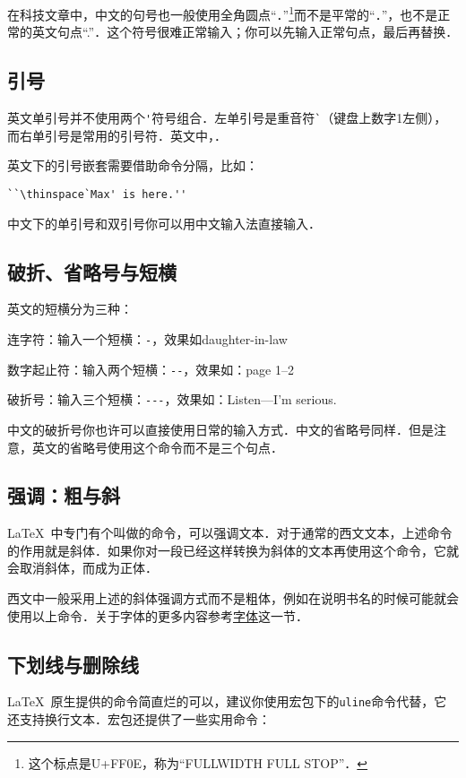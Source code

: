在科技文章中，中文的句号也一般使用全角圆点“．”\footnote{这个标点是U+FF0E，称为“FULLWIDTH FULL STOP”．}而不是平常的“．”，也不是正常的英文句点“.”．这个符号很难正常输入；你可以先输入正常句点，最后再替换．

\subsection{引号}
英文单引号并不使用两个\verb|'|符号组合．左单引号是重音符\verb|`|（键盘上数字1左侧），而右单引号是常用的引号符．英文中，．

英文下的引号嵌套需要借助命令分隔，比如：
\begin{verbatim}
``\thinspace`Max' is here.''
\end{verbatim}

中文下的单引号和双引号你可以用中文输入法直接输入．

\subsection{破折、省略号与短横}
英文的短横分为三种：
\begin{feai}
\item 连字符：输入一个短横：\verb|-|，效果如daughter-in-law
\item 数字起止符：输入两个短横：\verb|--|，效果如：page 1--2
\item 破折号：输入三个短横：\verb|---|，效果如：Listen---I'm serious.
\end{feai}

中文的破折号你也许可以直接使用日常的输入方式．中文的省略号同样．但是注意，英文的省略号使用这个命令而不是三个句点．

\subsection{强调：粗与斜}
\LaTeX\ 中专门有个叫做的命令，可以强调文本．对于通常的西文文本，上述命令的作用就是斜体．如果你对一段已经这样转换为斜体的文本再使用这个命令，它就会取消斜体，而成为正体．

西文中一般采用上述的斜体强调方式而不是粗体，例如在说明书名的时候可能就会使用以上命令．关于字体的更多内容参考\hyperref[sec:font]{字体}这一节．

\subsection{下划线与删除线}
\LaTeX\ 原生提供的命令简直烂的可以，建议你使用宏包下的\texttt{uline}命令代替，它还支持换行文本．宏包还提供了一些实用命令：

